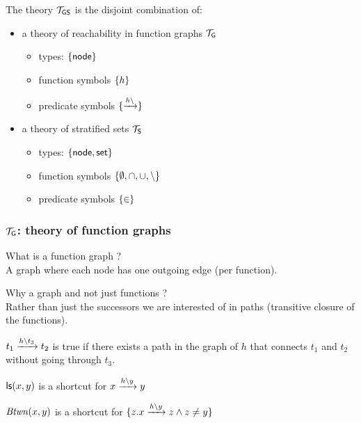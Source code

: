 \documentclass{beamer}
\begin{document}
\begin{frame}
  \frametitle{\LRJQ}
    The theory $\lrjqtheory$ is the disjoint combination of:
    \begin{itemize}
    \item a theory of reachability in function graphs $\graphtheory$
    \begin{itemize}
    \item types: $\set{\nodesort}$
    \item function symbols $\set{h}$
    \item predicate symbols $\set{\reachsym}$
    \end{itemize}
    \item a theory of stratified sets $\settheory$~\cite{Zarba04CombiningSetsElements}
    \begin{itemize}
    \item types: $\set{\nodesort, \setsort}$
    \item function symbols $\set{\emptyset, \cap, \cup, \setminus}$
    \item predicate symbols $\set{\in}$
    \end{itemize}
    \end{itemize}

\end{frame}

\begin{frame}
  \frametitle{$\graphtheory$: theory of function graphs}

  What is a function graph ?\\
  A graph where each node has one outgoing edge (per function).

  \vspace{1ex}

  Why a graph and not just functions ?\\
  Rather than just the successors we are interested of in paths (transitive closure of the functions).
  
  \vspace{1ex}
  
  $\creach{t_1}{t_2}{t_3}$ is true if there exists a path in the graph of $h$ that connects $t_1$ and $t_2$ without going through $t_3$.
  
  \vspace{1ex}
  
  $\ls(x,y)$ is a shortcut for $\creach{x}{y}{y}$

  $\Btwn(x,y)$ is a shortcut for $\{z. \creach{x}{z}{y} \land z \neq y\}$

\end{frame}
\end{document}
